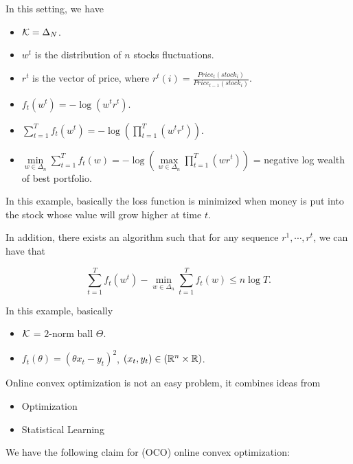 \documentclass[../main.tex]{subfiles}
\begin{document}
\begin{example}
	In this setting, we have
	
	\begin{itemize}
		\item $\mathcal{K} = \Delta_N$.
		\item $w^t$ is the distribution of $n$ stocks fluctuations.
		\item $r^t$ is the vector of price, where $r^t(i) = \frac{Price_t(stock_i)}{Price_{t-1}(stock_i)}$.
		\item $f_t(w^t) = -\log(w^t r^t) $.
		\item $\sum\limits_{t=1}^T f_t(w^t) = -\log(\prod_{t= 1}^T (w^t r^t)) $.
		\item $\min\limits_{w\in \Delta_n} \sum\limits_{t=1}^T f_t(w) = -\log(\max\limits_{w\in \Delta_n} \prod_{t= 1}^T (w r^t)) $ = negative log wealth of best portfolio.
	\end{itemize}
	
	In this example, basically the loss function is minimized when money is put into the stock whose value will grow higher at time $t$. 
	
	In addition, there exists an algorithm such that for any sequence $r^1, \cdots , r^t$, we can have that 
	
	\begin{equation*}
		\sum\limits_{t=1}^T f_t(w^t) - \min\limits_{w \in \Delta_n} \sum\limits_{t=1}^T f_t(w) \leq n \log T.
	\end{equation*}
\end{example}

\begin{example}
	In this example, basically 
	\begin{itemize}
		\item $\mathcal{K}$ = $2$-norm ball $\Theta$.
		\item $f_t(\theta) = (\theta x_t - y_t)^2$, $(x_t, y_t) \in (\mathbb{R}^n \times \mathbb{R})$.
	\end{itemize}
\end{example}

Online convex optimization is not an easy problem, it combines ideas from

\begin{itemize}
	\item Optimization
	\item Statistical Learning
\end{itemize}

We have the following claim for (OCO) online convex optimization:
\end{document}
